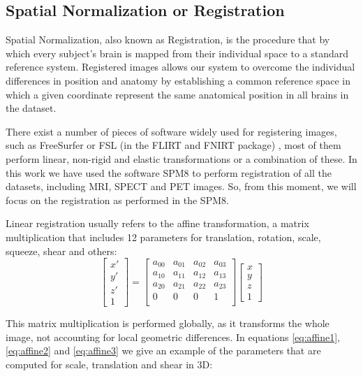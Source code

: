 \subsection{Spatial Normalization or Registration}
Spatial Normalization, also known as Registration, is the procedure that by which every subject's brain is mapped from their individual space to a standard reference system. Registered images allows our system to overcome the individual differences in position and anatomy by establishing a common reference space in which a given coordinate represent the same anatomical position in all brains in the dataset. 

There exist a number of pieces of software widely used for registering images, such as FreeSurfer \cite{Reuter2010} or FSL (in the FLIRT and FNIRT package) \cite{Smith2004}, most of them perform linear, non-rigid and elastic transformations or a combination of these. In this work we have used the software SPM8 \cite{spm_book} to perform registration of all the datasets, including \ac{MRI}, \ac{SPECT} and \ac{PET} images. So, from this moment, we will focus on the registration as performed in the \ac{SPM8}. 

Linear registration usually refers to the affine transformation, a matrix multiplication that includes 12 parameters for translation, rotation, scale, squeeze, shear and others: 
\begin{equation}\label{eq:affine}
	\left[\begin{matrix}
	x'\\y'\\z'\\1
	\end{matrix}\right]
	 = \left[\begin{matrix}
	 a_{00} & a_{01} & a_{02} & a_{03}\\
	 a_{10} & a_{11} & a_{12} & a_{13}\\
	 a_{20} & a_{21} & a_{22} & a_{23}\\
	 0 & 0 & 0 & 1\\
	 \end{matrix}\right]
	 \left[\begin{matrix}
	 x\\y\\z\\1
	 \end{matrix}\right]
\end{equation}

This matrix multiplication is performed globally, as it transforms the whole image, not accounting for local geometric differences. In equations \ref{eq:affine1}, \ref{eq:affine2} and \ref{eq:affine3} we give an example of the parameters that are computed for scale, translation and shear in 3D:

